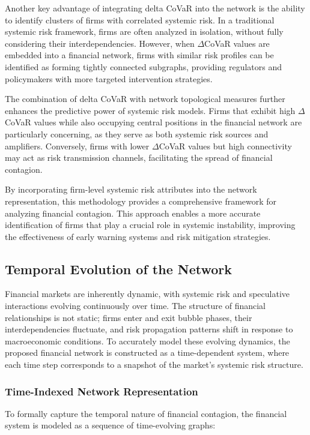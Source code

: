 \documentclass[preprint,12pt,authoryear]{elsarticle}
\begin{document}
Another key advantage of integrating delta CoVaR into the network is the ability to identify clusters of firms with correlated systemic risk. In a traditional systemic risk framework, firms are often analyzed in isolation, without fully considering their interdependencies. However, when \(\Delta\)CoVaR values are embedded into a financial network, firms with similar risk profiles can be identified as forming tightly connected subgraphs, providing regulators and policymakers with more targeted intervention strategies.

The combination of delta CoVaR with network topological measures further enhances the predictive power of systemic risk models. Firms that exhibit high \(\Delta\)CoVaR values while also occupying central positions in the financial network are particularly concerning, as they serve as both systemic risk sources and amplifiers. Conversely, firms with lower \(\Delta\)CoVaR values but high connectivity may act as risk transmission channels, facilitating the spread of financial contagion.

By incorporating firm-level systemic risk attributes into the network representation, this methodology provides a comprehensive framework for analyzing financial contagion. This approach enables a more accurate identification of firms that play a crucial role in systemic instability, improving the effectiveness of early warning systems and risk mitigation strategies.


\subsection{Temporal Evolution of the Network}  

Financial markets are inherently dynamic, with systemic risk and speculative interactions evolving continuously over time. The structure of financial relationships is not static; firms enter and exit bubble phases, their interdependencies fluctuate, and risk propagation patterns shift in response to macroeconomic conditions. To accurately model these evolving dynamics, the proposed financial network is constructed as a time-dependent system, where each time step corresponds to a snapshot of the market’s systemic risk structure.  

\subsubsection{Time-Indexed Network Representation}  

To formally capture the temporal nature of financial contagion, the financial system is modeled as a sequence of time-evolving graphs:
\end{document}
